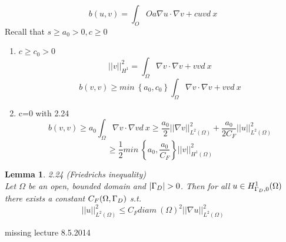 \documentclass[english]{article}
\newtheorem*{lemma}{Lemma}
\theoremstyle{definition}
\theoremstyle{remark}
\newcommand{\f}[2]{\frac{#1}{#2}}							%
\newcommand{\OO}{\Omega}
\begin{document}
$$b(u,v) = \int_OO a \nabla u \cdot \nabla v + cuv d\ x$$
Recall that $s\geq a_0 >0, c\geq 0$\\
\begin{enumerate}
	\item $c\geq c_0 >0$\\
	$$||v||^2_{H^1} = \int_\OO \nabla v \cdot \nabla v + vv d\ x$$
	$$b(v,v)\geq min\ \left\{a_0,c_0 \right\}\int_\OO \nabla v \cdot\nabla v + vv d\ x$$
	\item c=0 with 2.24 \\
	$$b(v,v)\geq a_0\int_\OO \nabla v \cdot \nabla v d\ x \geq \f{a_0}{2}||\nabla v||^2_{L^2(\OO)} + \f{a_0}{2C_F}||u||^2_{L^2(\OO)}$$
	$$\geq \f{1}{2} min\ \left\{a_0, \f{a_0}{C_F}\right\} ||v||^2 _{H^1(\OO)}$$
\end{enumerate}
\begin{lemma}2.24 (Friedrichs inequality)\\
Let $\OO$ be an open, bounded domain and $|\Gamma_D| >0$. Then for all $u \in H^1_{\GG_D,0}(\OO) $ there exists a constant $C_F(\OO,\GG_D)$ s.t. 
$$||u||^2_{L^2(\OO)} \leq C_F diam\ (\OO)^2 ||\nabla u||^2 _{L^2(\OO)}$$
\end{lemma}
\newpage


missing lecture 8.5.2014
\end{document}
